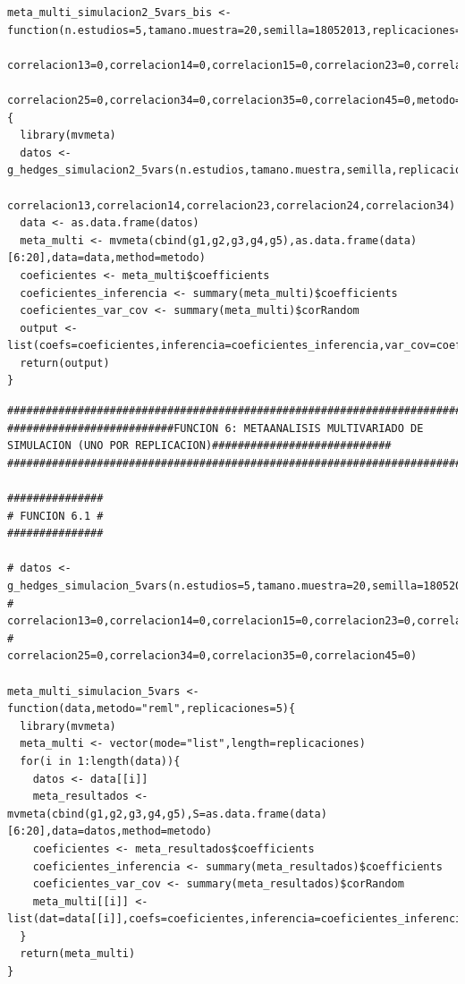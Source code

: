 \documentclass[a4paper,openright,12pt]{report}
\begin{document}
{\begin{verbatim}
meta_multi_simulacion2_5vars_bis <- function(n.estudios=5,tamano.muestra=20,semilla=18052013,replicaciones=5,correlacion12=0,
                                             correlacion13=0,correlacion14=0,correlacion15=0,correlacion23=0,correlacion24=0,
                                             correlacion25=0,correlacion34=0,correlacion35=0,correlacion45=0,metodo="reml"){
  library(mvmeta)
  datos <- g_hedges_simulacion2_5vars(n.estudios,tamano.muestra,semilla,replicaciones,correlacion12,
                                      correlacion13,correlacion14,correlacion23,correlacion24,correlacion34)
  data <- as.data.frame(datos)
  meta_multi <- mvmeta(cbind(g1,g2,g3,g4,g5),as.data.frame(data)[6:20],data=data,method=metodo)
  coeficientes <- meta_multi$coefficients
  coeficientes_inferencia <- summary(meta_multi)$coefficients
  coeficientes_var_cov <- summary(meta_multi)$corRandom
  output <- list(coefs=coeficientes,inferencia=coeficientes_inferencia,var_cov=coeficientes_var_cov)
  return(output)  
}
\end{verbatim}
\newpage
\begin{verbatim}
##############################################################################################################################
##########################FUNCION 6: METAANALISIS MULTIVARIADO DE SIMULACION (UNO POR REPLICACION)############################
##############################################################################################################################

###############
# FUNCION 6.1 #
###############

# datos <- g_hedges_simulacion_5vars(n.estudios=5,tamano.muestra=20,semilla=18052013,replicaciones=5,correlacion12=0,
#                                    correlacion13=0,correlacion14=0,correlacion15=0,correlacion23=0,correlacion24=0,
#                                    correlacion25=0,correlacion34=0,correlacion35=0,correlacion45=0)

meta_multi_simulacion_5vars <- function(data,metodo="reml",replicaciones=5){
  library(mvmeta)
  meta_multi <- vector(mode="list",length=replicaciones)
  for(i in 1:length(data)){
    datos <- data[[i]]
    meta_resultados <- mvmeta(cbind(g1,g2,g3,g4,g5),S=as.data.frame(data)[6:20],data=datos,method=metodo)
    coeficientes <- meta_resultados$coefficients
    coeficientes_inferencia <- summary(meta_resultados)$coefficients
    coeficientes_var_cov <- summary(meta_resultados)$corRandom
    meta_multi[[i]] <- list(dat=data[[i]],coefs=coeficientes,inferencia=coeficientes_inferencia,var_cov=coeficientes_var_cov)
  }
  return(meta_multi)  
}


\end{verbatim}}
\end{document}
